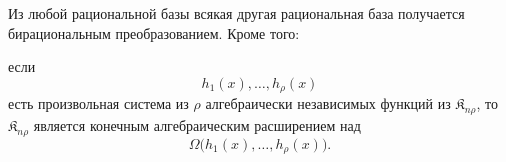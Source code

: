 \documentclass[11pt]{article}
\providecommand{\Kfield}{\mathfrak{K}}
\begin{document}
Из любой рациональной базы всякая другая рациональная база получается бирациональным преобразованием. Кроме того:

если
\[
  h_1(x),\ldots,h_\rho(x)
\]
есть произвольная система из $\rho$ алгебраически независимых функций из $\Kfield_{n\rho}$, то $\Kfield_{n\rho}$ является конечным алгебраическим расширением над
\[
  \Omega\bigl(h_1(x),\ldots,h_\rho(x)\bigr).
\]
\end{document}
